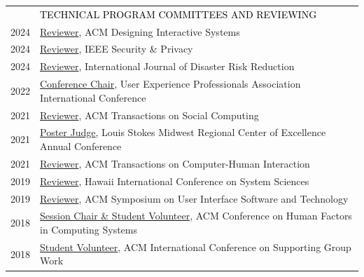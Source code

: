 \documentclass[12pt]{article}
\begin{document}
{\begin{longtable}{R{0.75in}p{5.0in}}
& \large \textcolor{black}{\uppercase{Technical Program Committees and Reviewing}}\\

\footnotesize{2024} & 
\href{https://dis.acm.org/}{Reviewer}, ACM Designing Interactive Systems\\

\footnotesize{2024} & 
\href{https://www.computer.org/csdl/magazine/sp}{Reviewer}, IEEE Security \& Privacy\\

\footnotesize{2024} & 
\href{https://www.sciencedirect.com/journal/international-journal-of-disaster-risk-reduction}{Reviewer}, International Journal of Disaster Risk Reduction\\

\footnotesize{2022} & 
\href{https://uxpa2024.org/conference-committee/}{Conference Chair}, User Experience Professionals Association International Conference\\

\footnotesize{2021} & 
\href{https://dl.acm.org/journal/tsc}{Reviewer}, ACM Transactions on Social Computing\\

\footnotesize{2021} & \href{https://lsmrce.org/events/annual/2021-annual/2021-conference-with-gratitude.aspx}{Poster Judge}, Louis Stokes Midwest Regional Center of Excellence Annual Conference\\

\footnotesize{2021} & 
\href{https://dl.acm.org/journal/tochi}{Reviewer}, ACM Transactions on Computer-Human Interaction\\

\footnotesize{2019} & \href{https://web.archive.org/web/20260703133254/https://hicss.hawaii.edu/}{Reviewer}, Hawaii International Conference on System Sciences\\

\footnotesize{2019} & \href{https://uist.acm.org/uist2019/}{Reviewer}, ACM Symposium on User Interface Software and Technology\\

\footnotesize{2018} & \href{https://chi2018.acm.org}{Session Chair \& Student Volunteer}, ACM Conference on Human Factors in Computing Systems\\

\footnotesize{2018} & \href{https://group.acm.org/conferences/group18/index.html}{Student Volunteer}, ACM International Conference on Supporting Group Work\\


\end{longtable}}
\end{document}
